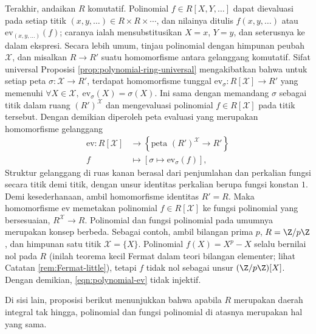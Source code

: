 Terakhir, andaikan $R$ komutatif. Polinomial $f \in R[X,Y,\ldots]$ dapat dievaluasi pada setiap titik $(x,y, \ldots) \in R \times R \times \cdots$, dan nilainya ditulis $f(x,y,\ldots)$ atau $\text{ev}_{(x,y,\ldots)}(f)$; caranya ialah mensubstitusikan $X=x$, $Y=y$, dan seterusnya ke dalam ekspresi. Secara lebih umum, tinjau polinomial dengan himpunan peubah $\mathcal{X}$, dan misalkan $R \to R'$ suatu homomorfisme antara gelanggang komutatif. Sifat universal Proposisi \ref{prop:polynomial-ring-universal} mengakibatkan bahwa untuk setiap peta $\sigma: \mathcal{X} \to R'$, terdapat homomorfisme tunggal $\text{ev}_\sigma: R[\mathcal{X}] \to R'$ yang memenuhi $\forall X \in \mathcal{X}, \;\text{ev}_\sigma(X) = \sigma(X)$. Ini sama dengan memandang $\sigma$ sebagai titik dalam ruang $(R')^\mathcal{X}$ dan mengevaluasi polinomial $f \in R[\mathcal{X}]$ pada titik tersebut. Dengan demikian diperoleh peta evaluasi yang merupakan homomorfisme gelanggang
\begin{equation}\label{eqn:polynomial-ev}\begin{aligned}
	\text{ev}: R[\mathcal{X}] & \longrightarrow \left\{ \text{peta } (R')^\mathcal{X} \to R' \right\} \\
	f & \longmapsto \left[ \sigma \mapsto \text{ev}_\sigma(f) \right],
\end{aligned}\end{equation}
Struktur gelanggang di ruas kanan berasal dari penjumlahan dan perkalian fungsi secara titik demi titik, dengan unsur identitas perkalian berupa fungsi konstan $1$. Demi kesederhanaan, ambil homomorfisme identitas $R'=R$. Maka homomorfisme $\text{ev}$ memetakan polinomial $f \in R[\mathcal{X}]$ ke fungsi polinomial yang bersesuaian, $R^\mathcal{X} \to R$. Polinomial dan fungsi polinomial pada umumnya merupakan konsep berbeda. Sebagai contoh, ambil bilangan prima $p$, $R = \Z/p\Z$, dan himpunan satu titik $\mathcal{X} = \{X\}$. Polinomial $f(X) = X^p - X$ selalu bernilai nol pada $R$ (inilah teorema kecil Fermat dalam teori bilangan elementer; lihat Catatan \ref{rem:Fermat-little}), tetapi $f$ tidak nol sebagai unsur $(\Z/p\Z)[X]$. Dengan demikian, \eqref{eqn:polynomial-ev} tidak injektif.

Di sisi lain, proposisi berikut menunjukkan bahwa apabila $R$ merupakan daerah integral tak hingga, polinomial dan fungsi polinomial di atasnya merupakan hal yang sama.

